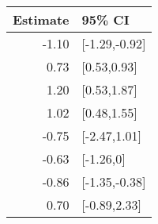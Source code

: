 \begin{tabular}{rl}
  \hline
Estimate & 95\% CI \\ 
  \hline
-1.10 & [-1.29,-0.92] \\ 
  0.73 & [0.53,0.93] \\ 
  1.20 & [0.53,1.87] \\ 
  1.02 & [0.48,1.55] \\ 
  -0.75 & [-2.47,1.01] \\ 
  -0.63 & [-1.26,0] \\ 
  -0.86 & [-1.35,-0.38] \\ 
  0.70 & [-0.89,2.33] \\ 
   \hline
\end{tabular}

